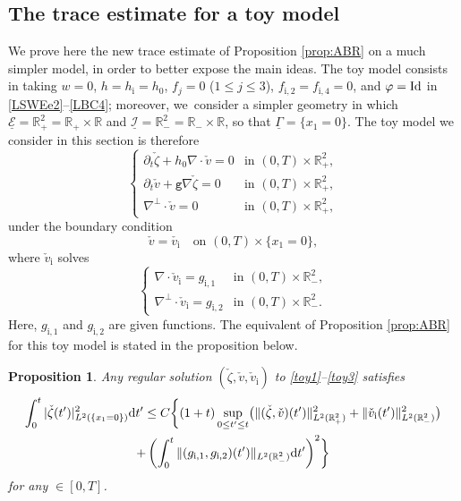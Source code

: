 \documentclass[10pt]{amsart}
\newcommand{\gr}{{\mathtt g}}
\newcommand{\R}{{\mathbb R}}
\newcommand{\dt}{\partial_t}
\newcommand{\ul}[1]{\underline{#1}}
\newcommand{\itGamma}{\mathit{\Gamma}}
\newtheorem{proposition}[theorem]{Proposition}
\theoremstyle{definition}
\begin{document}
\subsection{The trace estimate for a toy model}
We prove here the new trace estimate of Proposition \ref{prop:ABR} on a much simpler model, in order to better expose the main ideas.
The toy model consists in taking $w=0$, $h=h_\mathrm{i}=h_0$, $f_j=0$ ($1\leq j\leq 3$), $f_\mathrm{i,2}=f_\mathrm{i,4}=0$,
and $\varphi={\rm Id}$ in \eqref{LSWEe2}--\eqref{LBC4};
moreover, we~consider a simpler geometry in which $\ul{\mathcal E}=\R^2_+=\R_+\times \R$ and $\ul{\mathcal I}=\R^2_-=\R_-\times \R$,
so that $\ul{\itGamma}=\{x_1=0\}$.
The toy model we consider in this section is therefore
\begin{equation}\label{toy1}
\begin{cases}
\dt \check{\zeta}+h_0\nabla\cdot \check{v}=0 &\text{in } (0,T)\times \R^2_+, \\
\dt \check{v}+\gr \nabla \check{\zeta}=0 &\text{in } (0,T)\times \R^2_+, \\
\nabla^\perp\cdot\check{v}=0 &\text{in } (0,T)\times \R^2_+,
\end{cases}
\end{equation}
under the boundary condition
\begin{equation}\label{toy2}
\check{v}=\check{v_\mathrm{i}} \quad\text{on } (0,T)\times \{x_1=0\},
\end{equation}
where $\check{v}_\mathrm{i}$ solves
\begin{equation}\label{toy3}
\begin{cases}
\nabla\cdot \check{v}_\mathrm{i}=g_\mathrm{i,1} &\text{in } (0,T)\times \R^2_-, \\
\nabla^\perp\cdot \check{v}_\mathrm{i}=g_\mathrm{i,2} &\text{in } (0,T)\times \R^2_-.
\end{cases}
\end{equation}
Here, $g_\mathrm{i,1} $ and $g_\mathrm{i,2} $ are given functions.
The equivalent of Proposition \ref{prop:ABR} for this toy model is stated in the proposition below.

\begin{proposition}\label{prop:ABRtoy}
Any regular solution $(\check{\zeta},\check{v}, \check{v}_\mathrm{i})$ to \eqref{toy1}--\eqref{toy3} satisfies
\begin{multline*}
\int_0^t|\check{\zeta}(t')|_{L^2(\{x_1=0\})}^2\mathrm{d}t'
\leq C \biggl\{ (1+t)\sup_{0\leq t'\leq t}\bigl(\|(\check{\zeta},\check{v})(t')\|_{L^2({\R^2_+})}^2
+ \|\check{v}_\mathrm{i}(t')\|_{L^2(\R^2_-)}^2 \bigr) \\
+ \left(\int_0^t
\|(g_{{\rm i},1},g_{{\rm i},2})(t')\|_{L^2(\R^2_-)} {\rm d}t' \right)^2 \biggr\}
\end{multline*}
for any $\in[0,T]$.
\end{proposition}
\end{document}
